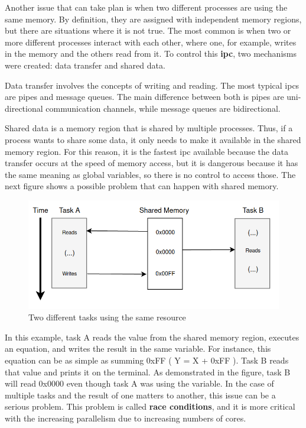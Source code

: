 Another issue that can take plan is when two different processes are using the same memory. By definition, they are assigned with independent memory regions, but there are situations where it is not true. The most common is when two or more different processes interact with each other, where one, for example, writes in the memory and the others read from it. To control this \textbf{\gls{ipc}}, two mechanisms were created: data transfer and shared data.

Data transfer involves the concepts of writing and reading. The most typical \glspl{ipc} are pipes and message queues. The main difference between both is pipes are uni-directional communication channels, while message queues are bidirectional.

Shared data is a memory region that is shared by multiple processes. Thus, if a process wants to share some data, it only needs to make it available in the shared memory region. For this reason, it is the fastest \gls{ipc} available because the data transfer occurs at the speed of memory access, but it is dangerous because it has the same meaning as global variables, so there is no control to access those. The next figure shows a possible problem that can happen with shared memory.

\begin{figure}[H]
	\centering
 	\includegraphics[width=0.7\linewidth]{Images/BeforeMutex.png}
 	\caption{ Two different tasks using the same resource }
	 \label{fig_BeforeMutex}
\end{figure}

In this example, task A reads the value from the shared memory region, executes an equation, and writes the result in the same variable. For instance, this equation can be as simple as summing 0xFF ( Y = X + 0xFF ). Task B reads that value and prints it on the terminal. As demonstrated in the figure, task B will read 0x0000 even though task A was using the variable. In the case of multiple tasks and the result of one matters to another, this issue can be a serious problem. This problem is called \textbf{race conditions}, and it is more critical with the increasing parallelism due to increasing numbers of cores.

